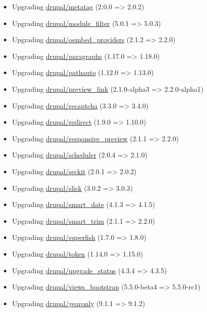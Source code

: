 \documentclass[letterpaper, 12pt, final]{article}
\newcommand{\module}[1]{\href{https://drupal.org/project/#1}{drupal/{#1}}}
\begin{document}
\begin{itemize}
    \item Upgrading \module{metatag} (2.0.0 => 2.0.2)
    \item Upgrading \module{module\_filter} (5.0.1 => 5.0.3)
    \item Upgrading \module{oembed\_providers} (2.1.2 => 2.2.0)
    \item Upgrading \module{paragraphs} (1.17.0 => 1.18.0)
    \item Upgrading \module{pathauto} (1.12.0 => 1.13.0)
    \item Upgrading \module{preview\_link} (2.1.0-alpha3 => 2.2.0-alpha1)
    \item Upgrading \module{recaptcha} (3.3.0 => 3.4.0)
    \item Upgrading \module{redirect} (1.9.0 => 1.10.0)
    \item Upgrading \module{responsive\_preview} (2.1.1 => 2.2.0)
    \item Upgrading \module{scheduler} (2.0.4 => 2.1.0)
    \item Upgrading \module{seckit} (2.0.1 => 2.0.2)
    \item Upgrading \module{slick} (3.0.2 => 3.0.3)
    \item Upgrading \module{smart\_date} (4.1.3 => 4.1.5)
    \item Upgrading \module{smart\_trim} (2.1.1 => 2.2.0)
    \item Upgrading \module{superfish} (1.7.0 => 1.8.0)
    \item Upgrading \module{token} (1.14.0 => 1.15.0)
    \item Upgrading \module{upgrade\_status} (4.3.4 => 4.3.5)
    \item Upgrading \module{views\_bootstrap} (5.5.0-beta4 => 5.5.0-rc1)
    \item Upgrading \module{yearonly} (9.1.1 => 9.1.2)
\end{itemize}
\end{document}
